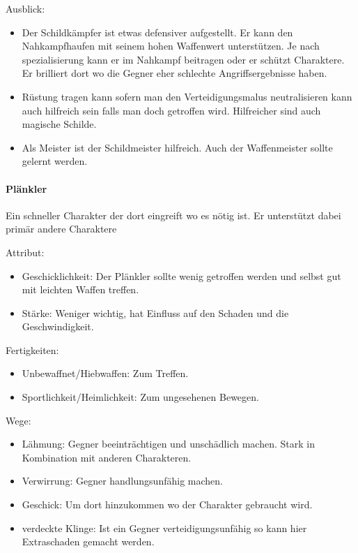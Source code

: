 \documentclass{article}
\begin{document}
Ausblick:
\begin{itemize}
\item Der Schildkämpfer ist etwas defensiver aufgestellt. Er kann den Nahkampfhaufen mit seinem hohen Waffenwert unterstützen. Je nach spezialisierung kann er im Nahkampf beitragen oder er schützt Charaktere. Er brilliert dort wo die Gegner eher schlechte Angriffsergebnisse haben.
\item Rüstung tragen kann sofern man den Verteidigungsmalus neutralisieren kann auch hilfreich sein falls man doch getroffen wird. Hilfreicher sind auch magische Schilde.
\item Als Meister ist der Schildmeister hilfreich. Auch der Waffenmeister sollte gelernt werden.
\end{itemize}

\paragraph{Plänkler}
Ein schneller Charakter der dort eingreift wo es nötig ist. Er unterstützt dabei primär andere Charaktere

Attribut:
\begin{itemize}
\item Geschicklichkeit: Der Plänkler sollte wenig getroffen werden und selbst gut mit leichten Waffen treffen.
\item Stärke: Weniger wichtig, hat Einfluss auf den Schaden und die Geschwindigkeit.
\end{itemize}

Fertigkeiten:
\begin{itemize}
\item Unbewaffnet/Hiebwaffen: Zum Treffen.
\item Sportlichkeit/Heimlichkeit: Zum ungesehenen Bewegen.
\end{itemize}

Wege:
\begin{itemize}
\item Lähmung: Gegner beeinträchtigen und unschädlich machen. Stark in Kombination mit anderen Charakteren.
\item Verwirrung: Gegner handlungsunfähig machen.
\item Geschick: Um dort hinzukommen wo der Charakter gebraucht wird.
\item verdeckte Klinge: Ist ein Gegner verteidigungsunfähig so kann hier Extraschaden gemacht werden.
\end{itemize}
\end{document}
